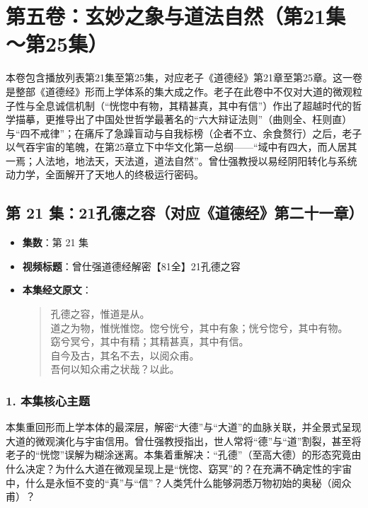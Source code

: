 \section*{第五卷：玄妙之象与道法自然（第21集～第25集）}

本卷包含播放列表第21集至第25集，对应老子《道德经》第21章至第25章。这一卷是整部《道德经》形而上学体系的集大成之作。老子在此卷中不仅对大道的微观粒子性与全息诚信机制（“恍惚中有物，其精甚真，其中有信”）作出了超越时代的哲学描摹，更推导出了中国处世哲学最著名的“六大辩证法则”（曲则全、枉则直）与“四不戒律”；在痛斥了急躁盲动与自我标榜（企者不立、余食赘行）之后，老子以气吞宇宙的笔魄，在第25章立下中华文化第一总纲——“域中有四大，而人居其一焉；人法地，地法天，天法道，道法自然”。曾仕强教授以易经阴阳转化与系统动力学，全面解开了天地人的终极运行密码。

\clearpage

\subsection{第 21 集：21孔德之容（对应《道德经》第二十一章）}
\label{sec:ep21}

\begin{itemize}
    \item \textbf{集数}：第 21 集
    \item \textbf{视频标题}：曾仕强道德经解密【81全】21孔德之容
    
    \item \textbf{本集经文原文}：
    \begin{quote}\kaishu
    孔德之容，惟道是从。\\
    道之为物，惟恍惟惚。惚兮恍兮，其中有象；恍兮惚兮，其中有物。\\
    窈兮冥兮，其中有精；其精甚真，其中有信。\\
    自今及古，其名不去，以阅众甫。\\
    吾何以知众甫之状哉？以此。
    \end{quote}
\end{itemize}

\subsubsection{1. 本集核心主题}
本集重回形而上学本体的最深层，解密“大德”与“大道”的血脉关联，并全景式呈现大道的微观演化与宇宙信用。曾仕强教授指出，世人常将“德”与“道”割裂，甚至将老子的“恍惚”误解为糊涂迷离。本集着重解决：“孔德”（至高大德）的形态究竟由什么决定？为什么大道在微观呈现上是“恍惚、窈冥”的？在充满不确定性的宇宙中，什么是永恒不变的“真”与“信”？人类凭什么能够洞悉万物初始的奥秘（阅众甫）？

